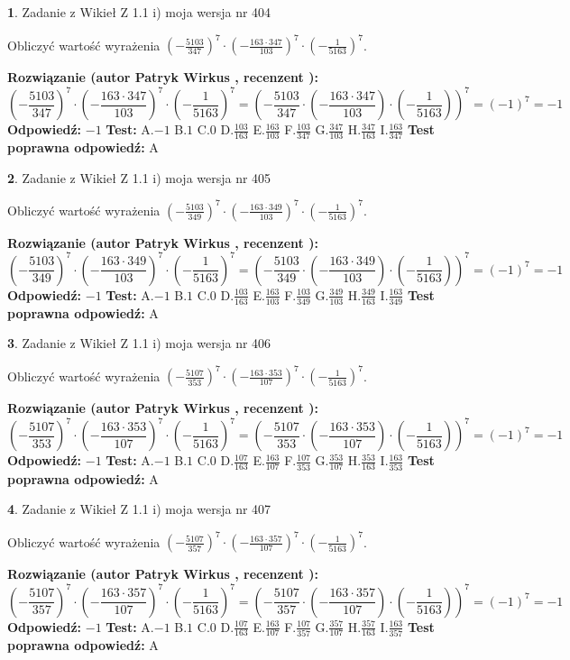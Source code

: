 \documentclass[12pt, a4paper]{article}
\theoremstyle{definition} %
\newtheorem{zad}{}
\newcommand{\zadStart}[1]{\begin{zad}#1\newline}
\newcommand{\zadStop}{\end{zad}}
\newcommand{\rozwStart}[2]{\noindent \textbf{Rozwiązanie (autor #1 , recenzent #2): }\newline}
\newcommand{\rozwStop}{\newline}
\newcommand{\odpStart}{\noindent \textbf{Odpowiedź:}\newline}
\newcommand{\odpStop}{\newline}
\newcommand{\testStart}{\noindent \textbf{Test:}\newline}
\newcommand{\testStop}{\newline}
\newcommand{\kluczStart}{\noindent \textbf{Test poprawna odpowiedź:}\newline}
\newcommand{\kluczStop}{\newline}
\begin{document}
\zadStart{Zadanie z Wikieł Z 1.1 i) moja wersja nr 404}

Obliczyć wartość wyrażenia $(-\frac{5103}{347})^{7} \cdot (-\frac{163 \cdot 347}{103})^{7} \cdot (-\frac{1}{5163})^{7}$.
\zadStop
\rozwStart{Patryk Wirkus}{}
$$(-\frac{5103}{347})^{7} \cdot (-\frac{163 \cdot 347}{103})^{7} \cdot (-\frac{1}{5163})^{7} = (-\frac{5103}{347} \cdot (-\frac{163 \cdot 347}{103}) \cdot (-\frac{1}{5163}))^{7} = (-1)^{7} = -1$$
\rozwStop
\odpStart
$-1$
\odpStop
\testStart
A.$-1$ B.$1$ C.$0$ D.$\frac{103}{163}$ E.$\frac{163}{103}$
F.$\frac{103}{347}$ G.$\frac{347}{103}$
H.$\frac{347}{163}$
I.$\frac{163}{347}$
\testStop
\kluczStart
A
\kluczStop



\zadStart{Zadanie z Wikieł Z 1.1 i) moja wersja nr 405}

Obliczyć wartość wyrażenia $(-\frac{5103}{349})^{7} \cdot (-\frac{163 \cdot 349}{103})^{7} \cdot (-\frac{1}{5163})^{7}$.
\zadStop
\rozwStart{Patryk Wirkus}{}
$$(-\frac{5103}{349})^{7} \cdot (-\frac{163 \cdot 349}{103})^{7} \cdot (-\frac{1}{5163})^{7} = (-\frac{5103}{349} \cdot (-\frac{163 \cdot 349}{103}) \cdot (-\frac{1}{5163}))^{7} = (-1)^{7} = -1$$
\rozwStop
\odpStart
$-1$
\odpStop
\testStart
A.$-1$ B.$1$ C.$0$ D.$\frac{103}{163}$ E.$\frac{163}{103}$
F.$\frac{103}{349}$ G.$\frac{349}{103}$
H.$\frac{349}{163}$
I.$\frac{163}{349}$
\testStop
\kluczStart
A
\kluczStop



\zadStart{Zadanie z Wikieł Z 1.1 i) moja wersja nr 406}

Obliczyć wartość wyrażenia $(-\frac{5107}{353})^{7} \cdot (-\frac{163 \cdot 353}{107})^{7} \cdot (-\frac{1}{5163})^{7}$.
\zadStop
\rozwStart{Patryk Wirkus}{}
$$(-\frac{5107}{353})^{7} \cdot (-\frac{163 \cdot 353}{107})^{7} \cdot (-\frac{1}{5163})^{7} = (-\frac{5107}{353} \cdot (-\frac{163 \cdot 353}{107}) \cdot (-\frac{1}{5163}))^{7} = (-1)^{7} = -1$$
\rozwStop
\odpStart
$-1$
\odpStop
\testStart
A.$-1$ B.$1$ C.$0$ D.$\frac{107}{163}$ E.$\frac{163}{107}$
F.$\frac{107}{353}$ G.$\frac{353}{107}$
H.$\frac{353}{163}$
I.$\frac{163}{353}$
\testStop
\kluczStart
A
\kluczStop



\zadStart{Zadanie z Wikieł Z 1.1 i) moja wersja nr 407}

Obliczyć wartość wyrażenia $(-\frac{5107}{357})^{7} \cdot (-\frac{163 \cdot 357}{107})^{7} \cdot (-\frac{1}{5163})^{7}$.
\zadStop
\rozwStart{Patryk Wirkus}{}
$$(-\frac{5107}{357})^{7} \cdot (-\frac{163 \cdot 357}{107})^{7} \cdot (-\frac{1}{5163})^{7} = (-\frac{5107}{357} \cdot (-\frac{163 \cdot 357}{107}) \cdot (-\frac{1}{5163}))^{7} = (-1)^{7} = -1$$
\rozwStop
\odpStart
$-1$
\odpStop
\testStart
A.$-1$ B.$1$ C.$0$ D.$\frac{107}{163}$ E.$\frac{163}{107}$
F.$\frac{107}{357}$ G.$\frac{357}{107}$
H.$\frac{357}{163}$
I.$\frac{163}{357}$
\testStop
\kluczStart
A
\kluczStop
\end{document}
